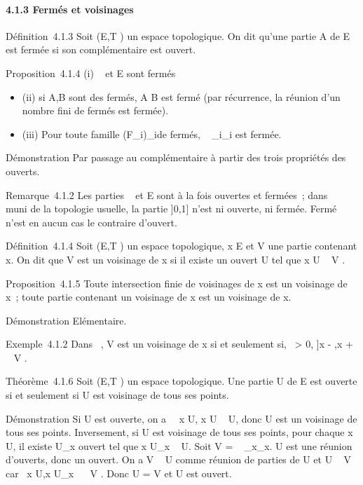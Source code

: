 \documentclass[]{article}
\begin{document}
\paragraph{4.1.3 Fermés et voisinages}

Définition~4.1.3 Soit (E,T ) un espace topologique. On dit qu'une partie
A de E est fermée si son complémentaire est ouvert.

Proposition~4.1.4 (i) \varnothing~ et E sont fermés

\begin{itemize}
\itemsep1pt\parskip0pt
\item
  (ii) si A,B sont des fermés, A \cup B est fermé (par récurrence, la
  réunion d'un nombre fini de fermés est fermée).
\item
  (iii) Pour toute famille (F_i)_i\inI de fermés,
  \⋂ ~
  _i\inIF_i est fermée.
\end{itemize}

Démonstration Par passage au complémentaire à partir des trois
propriétés des ouverts.

Remarque~4.1.2 Les parties \varnothing~ et E sont à la fois ouvertes et fermées~;
dans ~ muni de la topologie usuelle, la partie {]}0,1{]} n'est ni
ouverte, ni fermée. Fermé n'est en aucun cas le contraire d'ouvert.

Définition~4.1.4 Soit (E,T ) un espace topologique, x \in E et V une
partie contenant x. On dit que V est un voisinage de x si il existe un
ouvert U tel que x \in U \subset~ V .

Proposition~4.1.5 Toute intersection finie de voisinages de x est un
voisinage de x~; toute partie contenant un voisinage de x est un
voisinage de x.

Démonstration Elémentaire.

Exemple~4.1.2 Dans ~, V est un voisinage de x si et seulement si,
\exists~\epsilon \textgreater{} 0, {]}x - \epsilon,x + \epsilon{[}\subset~ V .

Théorème~4.1.6 Soit (E,T ) un espace topologique. Une partie U de E est
ouverte si et seulement si U est voisinage de tous ses points.

Démonstration Si U est ouverte, on a \forall~~x \in U, x
\in U \subset~ U, donc U est un voisinage de tous ses points. Inversement, si U
est voisinage de tous ses points, pour chaque x \in U, il existe
U_x ouvert tel que x \in U_x \subset~ U. Soit V
= \⋃ ~
_x\inUU_x. U est une réunion d'ouverts, donc un ouvert. On
a V \subset~ U comme réunion de parties de U et U \subset~ V car
\forall~x \in U,x \in U_x~ \subset~ V . Donc U = V et U
est ouvert.
\end{document}
